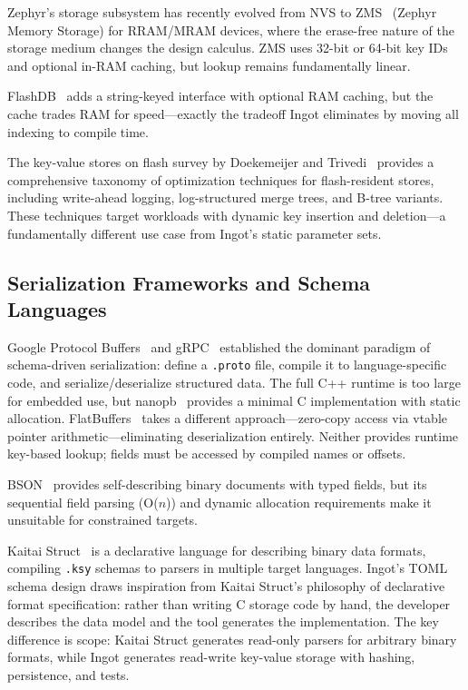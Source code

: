 \documentclass[10pt,twocolumn,letterpaper]{article}
\begin{document}
Zephyr's storage subsystem has recently evolved from NVS to
ZMS~\cite{zephyr-zms} (Zephyr Memory Storage) for RRAM/MRAM devices,
where the erase-free nature of the storage medium changes the design
calculus.  ZMS uses 32-bit or 64-bit key IDs and optional in-RAM
caching, but lookup remains fundamentally linear.

FlashDB~\cite{flashdb} adds a string-keyed interface with optional
RAM caching, but the cache trades RAM for speed---exactly the
tradeoff Ingot eliminates by moving all indexing to compile time.

The key-value stores on flash survey by Doekemeijer and
Trivedi~\cite{kv-flash-survey} provides a comprehensive taxonomy of
optimization techniques for flash-resident stores, including
write-ahead logging, log-structured merge trees, and B-tree variants.
These techniques target workloads with dynamic key insertion and
deletion---a fundamentally different use case from Ingot's static
parameter sets.

\subsection{Serialization Frameworks and Schema Languages}

Google Protocol Buffers~\cite{protobuf} and gRPC~\cite{grpc}
established the dominant paradigm of schema-driven serialization:
define a \texttt{.proto} file, compile it to language-specific code,
and serialize/deserialize structured data.  The full C++ runtime is
too large for embedded use, but nanopb~\cite{nanopb} provides a
minimal C implementation with static allocation.  FlatBuffers~\cite{flatbuffers}
takes a different approach---zero-copy access via vtable pointer
arithmetic---eliminating deserialization entirely.  Neither provides
runtime key-based lookup; fields must be accessed by compiled names
or offsets.

BSON~\cite{bson} provides self-describing binary documents with typed
fields, but its sequential field parsing (O($n$)) and dynamic
allocation requirements make it unsuitable for constrained targets.

Kaitai Struct~\cite{kaitai} is a declarative language for describing
binary data formats, compiling \texttt{.ksy} schemas to parsers in
multiple target languages.  Ingot's TOML schema design draws
inspiration from Kaitai Struct's philosophy of declarative format
specification: rather than writing C storage code by hand, the
developer describes the data model and the tool generates the
implementation.  The key difference is scope: Kaitai Struct generates
read-only parsers for arbitrary binary formats, while Ingot generates
read-write key-value storage with hashing, persistence, and tests.
\end{document}
